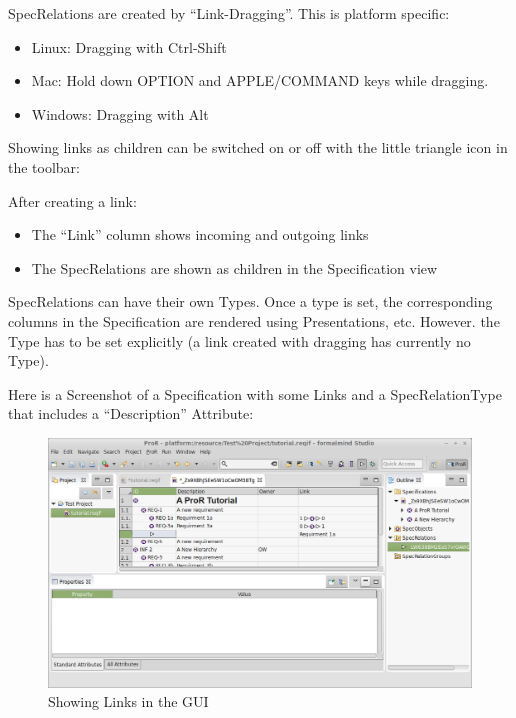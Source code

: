 SpecRelations are created by ``Link-Dragging''.  This is platform specific:

\begin{itemize}

\item
  Linux: Dragging with Ctrl-Shift
\item
  Mac: Hold down OPTION and APPLE/COMMAND keys while dragging.
\item
  Windows: Dragging with Alt
\end{itemize}

Showing links as children can be switched on or off with the little triangle icon in the toolbar:

After creating a link:

\begin{itemize}
\item
  The ``Link'' column shows incoming and outgoing links
\item
  The SpecRelations are shown as children in the Specification view
\end{itemize}

SpecRelations can have their own Types.  Once a type is set, the corresponding columns in the Specification are rendered using Presentations, etc.  However.  the Type has to be set explicitly (a link created with dragging has currently no Type).

Here is a Screenshot of a Specification with some Links and a SpecRelationType that includes a ``Description'' Attribute:

\begin{figure}[H]      
\centering      
\includegraphics[width=\linewidth]{../rmf-images/links.png}      
\caption{Showing Links in the GUI}      
\label{fig:linksInGui}
\end{figure}

